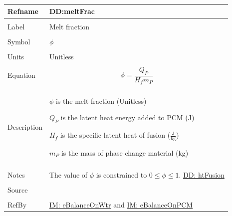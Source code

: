 \documentclass[12pt]{article}
\begin{document}
\noindent \begin{minipage}{\textwidth}
\begin{tabular}{p{} p{}}
\toprule \textbf{Refname} & \textbf{DD:meltFrac}
\label{DD:meltFrac}
\\ \midrule \\
Label & Melt fraction
\\ \midrule \\
Symbol & $ϕ$
\\ \midrule \\
Units & Unitless
\\ \midrule \\
Equation & \begin{displaymath}
           ϕ=\frac{{Q_{P}}}{{H_{f}} {m_{P}}}
           \end{displaymath}
\\ \midrule \\
Description & \begin{symbDescription}
              \item{$ϕ$ is the melt fraction (Unitless)}
              \item{${Q_{P}}$ is the latent heat energy added to PCM (J)}
              \item{${H_{f}}$ is the specific latent heat of fusion ($\frac{\text{J}}{\text{kg}}$)}
              \item{${m_{P}}$ is the mass of phase change material (kg)}
              \end{symbDescription}
\\ \midrule \\
Notes & The value of $ϕ$ is constrained to $0\leq{}ϕ\leq{}1$.
        \hyperref[DD:htFusion]{DD: htFusion}
\\ \midrule \\
Source & \cite{koothoor2013}
\\ \midrule \\
RefBy & \hyperref[IM:eBalanceOnWtr]{IM: eBalanceOnWtr} and \hyperref[IM:eBalanceOnPCM]{IM: eBalanceOnPCM}
\\ \bottomrule \end{tabular}
\end{minipage}
\end{document}
